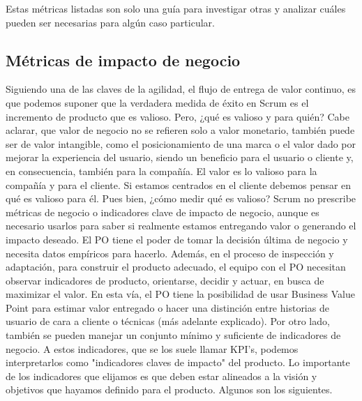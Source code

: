 Estas métricas listadas son solo una guía para investigar otras y analizar cuáles pueden ser necesarias para algún caso particular.

\subsection{Métricas de impacto de negocio}

Siguiendo una de las claves de la agilidad, el flujo de entrega de valor continuo, es que podemos suponer que la verdadera medida de éxito en Scrum es el incremento de producto que es valioso. Pero, ¿qué es valioso y para quién? Cabe aclarar, que valor de negocio no se refieren solo a valor monetario, también puede ser de valor intangible, como el posicionamiento de una marca o el valor dado por mejorar la experiencia del usuario, siendo un beneficio para el usuario o cliente y, en consecuencia, también para la compañía. El valor es lo valioso para la compañía y para el cliente. Si estamos centrados en el cliente debemos pensar en qué es valioso para él. Pues bien, ¿cómo medir qué es valioso?
Scrum no prescribe métricas de negocio o indicadores clave de impacto de negocio, aunque es necesario usarlos para saber si realmente estamos entregando valor o generando el impacto deseado. El PO tiene el poder de tomar la decisión última de negocio y necesita datos empíricos para hacerlo. Además, en el proceso de inspección y adaptación, para construir el producto adecuado, el equipo con el PO necesitan observar indicadores de producto, orientarse, decidir y actuar, en busca de maximizar el valor. En esta vía, el PO tiene la posibilidad de usar Business Value Point para estimar valor entregado o hacer una distinción entre historias de usuario de cara a cliente o técnicas (más adelante explicado). Por otro lado, también se pueden manejar un conjunto mínimo y suficiente de indicadores de negocio. A estos indicadores, que se los suele llamar KPI's, podemos interpretarlos como "indicadores claves de impacto" del producto. Lo importante de los indicadores que elijamos es que deben estar alineados a la visión y objetivos que hayamos definido para el producto.
Algunos son los siguientes.



